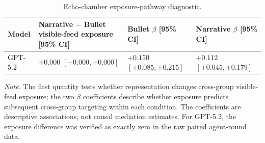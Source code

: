 \begin{table}[t]
\centering
\scriptsize
\setlength{\tabcolsep}{3pt}
\caption{Echo-chamber exposure-pathway diagnostic.}
\label{tab:appendix-ec-exposure-diagnostic}
\begin{tabular}{lp{4.0cm}p{4.0cm}p{4.0cm}}
\toprule
Model & Narrative $-$ Bullet visible-feed exposure [95\% CI] & Bullet $\beta$ [95\% CI] & Narrative $\beta$ [95\% CI] \\
\midrule
GPT-5.2 & $+0.000$ $[+0.000, +0.000]$ & $+0.150$ $[+0.085, +0.215]$ & $+0.112$ $[+0.045, +0.179]$ \\
\bottomrule
\end{tabular}
\vspace{2pt}
\parbox{0.99\textwidth}{\scriptsize \textit{Note.} The first quantity tests whether representation changes cross-group visible-feed exposure; the two $\beta$ coefficients describe whether exposure predicts subsequent cross-group targeting within each condition. The coefficients are descriptive associations, not causal mediation estimates. For GPT-5.2, the exposure difference was verified as exactly zero in the raw paired agent-round data.}
\end{table}

